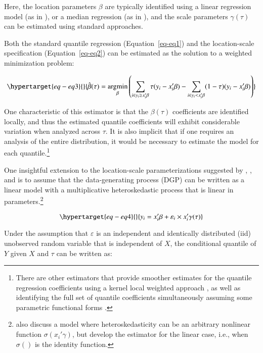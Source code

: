 \documentclass[
  authoryear,
  preprint,
  1p]{elsarticle}
\begin{document}
Here, the location parameters \(\beta\) are typically identified using a
linear regression model (as in \citet{mss2019}), or a median regression
(as in \citet{melly2005}), and the scale parameters \(\gamma(\tau)\) can
be estimated using standard approaches.

Both the standard quantile regression (Equation~\ref{eq-eq1}) and the
location-scale specification (Equation~\ref{eq-eq2}) can be estimated as
the solution to a weighted minimization problem:

\begin{equation}\protect\hypertarget{eq-eq3}{}{\hat{\beta}(\tau) = \underset{\beta}{\operatorname{argmin}}
\left( \sum_{i\in y_i\geq x_i'\beta} \tau (y_i - x_i'\beta) - \sum_{i\in y_i<x_i'\beta} (1-\tau)(y_i - x_i'\beta) \right)
}\label{eq-eq3}\end{equation}

One characteristic of this estimator is that the \(\beta(\tau)\)
coefficients are identified locally, and thus the estimated quantile
coefficients will exhibit considerable variation when analyzed across
\(\tau\). It is also implicit that if one requires an analysis of the
entire distribution, it would be necessary to estimate the model for
each quantile.\footnote{There are other estimators that provide smoother
  estimates for the quantile regression coefficients using a kernel
  local weighted approach \citep{kaplan2017}, as well as identifying the
  full set of quantile coefficients simultaneously assuming some
  parametric functional forms \citep{frumentobotai2016}.}

One insightful extension to the location-scale parameterizations
suggested by \citet{he1997}, \citet{cameron2005}, and \citet{mss2019} is
to assume that the data-generating process (DGP) can be written as a
linear model with a multiplicative heteroskedastic process that is
linear in parameters.\footnote{\citet{mss2019} also discuss a model
  where heteroskedasticity can be an arbitrary nonlinear function
  \(\sigma(x_i'\gamma)\), but develop the estimator for the linear case,
  i.e., when \(\sigma()\) is the identity function.}

\begin{equation}\protect\hypertarget{eq-eq4}{}{y_i=x_i'\beta+\varepsilon_i \times x_i'\gamma(\tau)
}\label{eq-eq4}\end{equation}

Under the assumption that \(\varepsilon\) is an independent and
identically distributed (iid) unobserved random variable that is
independent of \(X\), the conditional quantile of \(Y\) given \(X\) and
\(\tau\) can be written as:
\end{document}
